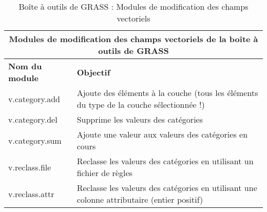\begin{table}[H]
\centering
 \begin{tabular}{|p{4cm}|p{10cm}|}
  \hline \multicolumn{2}{|c|}{\textbf{Modules de modification des champs vectoriels de la boîte à outils de GRASS}} \\
  \hline \textbf{Nom du module} & \textbf{Objectif} \\
  \hline v.category.add & Ajoute des éléments à la couche (tous les éléments du type de la couche sélectionnée !)\\
  \hline v.category.del & Supprime les valeurs des catégories\\
  \hline v.category.sum & Ajoute une valeur aux valeurs des catégories en cours\\
  \hline v.reclass.file & Reclasse les valeurs des catégories en utilisant un fichier de règles\\
  \hline v.reclass.attr & Reclasse les valeurs des catégories en utilisant une colonne attributaire (entier positif)\\
\hline
\end{tabular}
\caption{Boîte à outils de GRASS : Modules de modification des champs vectoriels}
\end{table}

